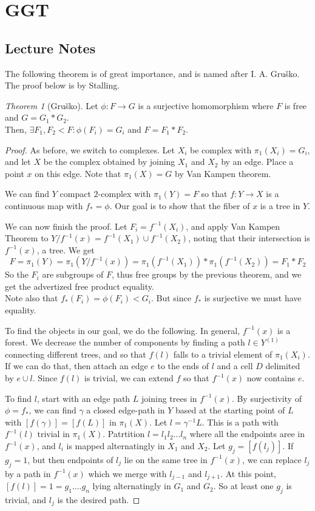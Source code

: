 \documentclass[11pt]{article}
\theoremstyle{definition}
\theoremstyle{example}
\theoremstyle{remark}
\theoremstyle{lemma}
\theoremstyle{proposition}
\theoremstyle{Problem}
\theoremstyle{Solution}
\theoremstyle{theorem}
\newtheorem{theorem}{Theorem}[section]
\theoremstyle{corollary}
\begin{document}
\section{GGT}
\subsection{Lecture Notes}
The following theorem is of great importance, and is named after I. A. Gru\v{s}ko. The proof below is by Stalling.
\begin{theorem}[Gru\v{s}ko]
Let $\phi: F \to G$ is a surjective homomorphism where $F$ is free and $G = G_1 * G_2$.\\
Then, $\exists F_1, F_2 < F : \phi(F_i) = G_i$ and $F = F_1 * F_2$.
\end{theorem}
\begin{proof}
As before, we switch to complexes. Let $X_i$ be complex with $\pi_1(X_i) = G_i$, and let $X$ be the complex obtained by joining $X_1$ and $X_2$ by an edge. Place a point $x$ on this edge. Note that $\pi_1(X) = G$ by Van Kampen theorem.


We can find $Y$ compact $2$-complex with $\pi_1(Y) = F$ so that $f:Y\to X$ is a continuous map with $f_* = \phi$. Our goal is to show that the fiber of $x$ is a tree in $Y$.

We can now finish the proof. Let $F_i = f^{-1}(X_i)$, and apply Van Kampen Theorem to $Y/f^{-1}(x) = f^{-1}(X_1) \cup f^{-1}(X_2)$, noting that their intersection is $f^{-1}(x)$, a tree. We get 
$$F = \pi_1(Y) = \pi_1(Y/f^{-1}(x)) = \pi_1(f^{-1}(X_1))*\pi_1(f^{-1}(X_2)) = F_1*F_2$$
So the $F_i$ are subgroups of $F$, thus free groups by the previous theorem, and we get the advertized free product equality. \\
Note also that $f_*(F_i) = \phi(F_i) < G_i$. But since $f_*$ is surjective we must have equality. 


To find the objects in our goal, we do the following. In general, $f^{-1}(x)$ is a forest. We decrease the number of components by finding a path $l\in Y^{(1)}$ connecting different trees, and so that $f(l)$ falls to a trivial element of $\pi_1(X_i)$. If we can do that, then attach an edge $e$ to the ends of $l$ and a cell $D$ delimited by $e\cup l$. Since $f(l)$ is trivial, we can extend $f$ so that $f^{-1}(x)$ now contains $e$.

To find $l$, start with an edge path $L$ joining trees in $f^{-1}(x)$. By surjectivity of $\phi=f_*$, we can find $\gamma$ a closed edge-path in $Y$ based at the starting point of $L$ with $[f(\gamma)] = [f(L)]$ in $\pi_1(X)$. Let $l=\gamma^{-1}L$. This is a path with $f^{-1}(l)$ trivial in $\pi_1(X)$. Patrtition $l=l_1l_2...l_n$ where all the endpoints aree in $f^{-1}(x)$, and $l_i$ is mapped alternatingly in $X_1$ and $X_2$. Let $g_j=[f(l_j)]$. If $g_j=1$, but then endpoints of $l_j$ lie on the same tree in $f^{-1}(x)$, we can replace $l_j$ by a path in $f^{-1}(x)$ which we merge with $l_{j-1}$ and $l_{j+1}$. At this point, $[f(l)] = 1 = g_1....g_n$ lying alternatingly in $G_1$ and $G_2$. So at least one $g_j$ is trivial, and $l_j$ is the desired path.
\end{proof}
\end{document}
